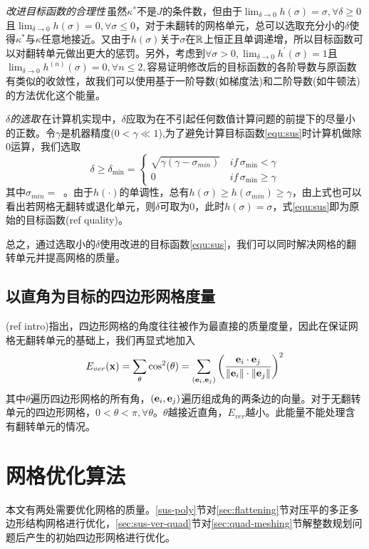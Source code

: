 \emph{改进目标函数的合理性}\,虽然$\kappa^*$不是$J$的条件数，但由于$\lim_{\delta \to 0}h(\sigma)=\sigma,\forall \delta \geq 0$且$\lim_{\delta \to 0}h(\sigma)=0,\forall \sigma \leq 0$，对于未翻转的网格单元，总可以选取充分小的$\delta$使得$\kappa^*$与$\kappa$任意地接近。又由于$h(\sigma)$关于$\sigma$在$\mathbb{R}$上恒正且单调递增，所以目标函数可以对翻转单元做出更大的惩罚。另外，考虑到$\forall \sigma>0,\lim_{\delta \to 0}h^{'}(\sigma)=1$且$\lim_{\delta \to 0}h^{(n)}(\sigma)=0,\forall n \leq 2,$容易证明修改后的目标函数的各阶导数与原函数有类似的收敛性，故我们可以使用基于一阶导数(如梯度法)和二阶导数(如牛顿法)的方法优化这个能量。

\emph{$\delta$的选取}\,在计算机实现中，$\delta$应取为在不引起任何数值计算问题的前提下的尽量小的正数。令$\gamma$是机器精度($0<\gamma \ll 1$),为了避免计算目标函数\ref{equ:sus}时计算机做除0运算，我们选取
\begin{equation}\label{equ:delta}
\delta \geq \delta_{\min}
=\left\{
	\begin{array}{cc}
	\sqrt{\gamma(\gamma-\sigma_{min})} & \,if\, \sigma_{\min}<\gamma \\ 
	0 & \,if\, \sigma_{\min}\geq\gamma
	\end{array}
	\right. 
\end{equation}
其中$\sigma_{min}=\mathop{\min_{m=1,...,M}(\sigma_m)}$。由于$h(\cdot)$的单调性，总有$h(\sigma) \geq h(\sigma_{min}) \geq \gamma$，由上式也可以看出若网格无翻转或退化单元，则$\delta$可取为0，此时$h(\sigma)=\sigma$，式\ref{equ:sus}即为原始的目标函数(ref quality)。

总之，通过选取小的$\delta$使用改进的目标函数\ref{equ:sus}，我们可以同时解决网格的翻转单元并提高网格的质量。
\subsection{以直角为目标的四边形网格度量}\label{sec:vertical}
(ref intro)指出，四边形网格的角度往往被作为最直接的质量度量，因此在保证网格无翻转单元的基础上，我们再显式地加入
\begin{equation} \label{equ:vertical}
E_{ver}(\mathbf{x})=\sum_{\theta} \cos ^2(\theta)
=
\sum_{(\mathbf{e}_i,\mathbf{e}_j)}\left(\frac{\mathbf{e}_i\cdot \mathbf{e}_j}{\left\|\mathbf{e}_i\right\|\cdot\left\|\mathbf{e}_j \right\|}\right)^2
\end{equation}
其中$\theta$遍历四边形网格的所有角，$(\mathbf{e}_i,\mathbf{e}_j)$遍历组成角的两条边的向量。对于无翻转单元的四边形网格，$0<\theta<\pi,\forall \theta$。$\theta$越接近直角，$E_{ver}$越小。此能量不能处理含有翻转单元的情况。
\section{网格优化算法} \label{sec:optimization}
本文有两处需要优化网格的质量。\ref{sus-poly}节对\ref{sec:flattening}节对压平的多正多边形结构网格进行优化，\ref{sec:sus-ver-quad}节对\ref{sec:quad-meshing}节解整数规划问题后产生的初始四边形网格进行优化。

